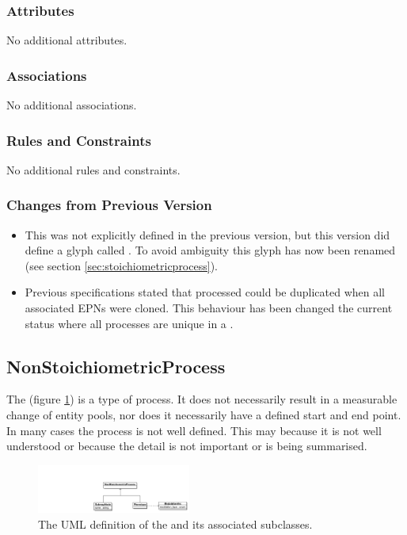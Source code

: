 \subsubsection{Attributes}

No additional attributes.

\subsubsection{Associations}

No additional associations.

\subsubsection{Rules and Constraints}

No additional rules and constraints.

\subsubsection{Changes from Previous Version}
\begin{itemize}
\item This was not explicitly defined in the previous version, but
  this version did define a glyph called . To avoid
  ambiguity this glyph has now been renamed  (see section \ref{sec:stoichiometricprocess}).
\item Previous specifications stated that processed could be
  duplicated when all associated EPNs were cloned. This behaviour has
  been changed the current status where all processes are unique in a \PDm.
\end{itemize}

\subsection{NonStoichiometricProcess}
\label{defn:NonStoichiometricProcess}

The  (figure
\ref{fig:nonstoichprocessuml}) is a type of process. It does not
necessarily result in a measurable change of entity pools, nor does it
necessarily have a defined start and end point. In many cases the
process is not well defined. This may because it is not well
understood or because the detail is not important or is being
summarised.

\begin{figure}[htb]
  \centering
  \includegraphics[width = 0.45\textwidth]{images/nonstoichprocessuml}
  \caption{The UML definition of the  and its
    associated subclasses.}
  \label{fig:nonstoichprocessuml}
\end{figure}

